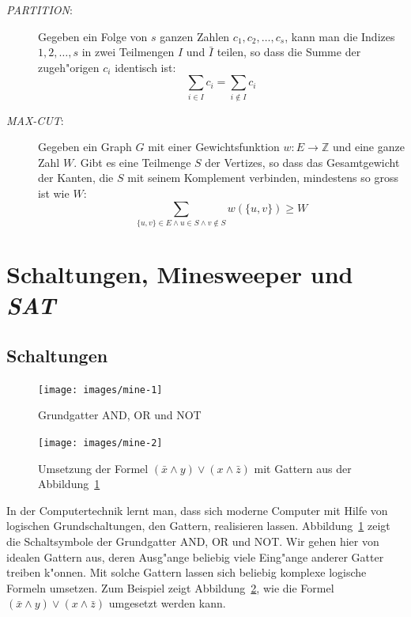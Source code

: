 \begin{description}
\[\]
\item[\textsl{PARTITION}:] Gegeben ein Folge von $s$ ganzen Zahlen
$c_1,c_2,\dots,c_s$, kann man die Indizes $1,2,\dots,s$ in zwei
Teilmengen $I$ und $\bar I$ teilen, so dass die Summe der zugeh"origen
$c_i$ identisch ist:
\[
\sum_{i\in I}c_i=\sum_{i\not\in I}c_i
\]
\item[\textsl{MAX-CUT}:] Gegeben ein Graph $G$ mit einer Gewichtsfunktion
$w\colon E\to\mathbb Z$ und eine ganze Zahl $W$. Gibt es eine Teilmenge
$S$ der Vertizes, so dass das Gesamtgewicht der Kanten, die $S$ mit
seinem Komplement verbinden, mindestens so gross ist wie $W$:
\[
\sum_{\{u,v\}\in E\wedge u\in S\wedge v\not\in S} w(\{u,v\})\ge W
\]
\end{description}



\section{Schaltungen, Minesweeper und \textsl{SAT}}
\subsection{Schaltungen}
\begin{figure}
\begin{center}
\texttt{[image: images/mine-1]}
\end{center}
\caption{Grundgatter AND, OR und NOT\label{gatter}}
\end{figure}%
\begin{figure}
\begin{center}
\texttt{[image: images/mine-2]}
\end{center}
\caption{Umsetzung der Formel
$(\bar x\wedge y)\vee(x\wedge \bar z)$ mit Gattern aus der
Abbildung~\ref{gatter}\label{gatterformel}}
\end{figure}%
In der Computertechnik lernt man, dass sich moderne Computer mit
Hilfe von logischen Grundschaltungen, den Gattern, realisieren lassen.
Abbildung~\ref{gatter} zeigt die Schaltsymbole der Grundgatter AND, OR
und NOT. Wir gehen hier von idealen Gattern aus, deren Ausg"ange beliebig
viele Eing"ange anderer Gatter treiben k"onnen. Mit solche Gattern
lassen sich beliebig komplexe logische Formeln umsetzen. Zum Beispiel
zeigt Abbildung~\ref{gatterformel}, wie die Formel
$(\bar x\wedge y)\vee(x\wedge \bar z)$ umgesetzt werden kann.

